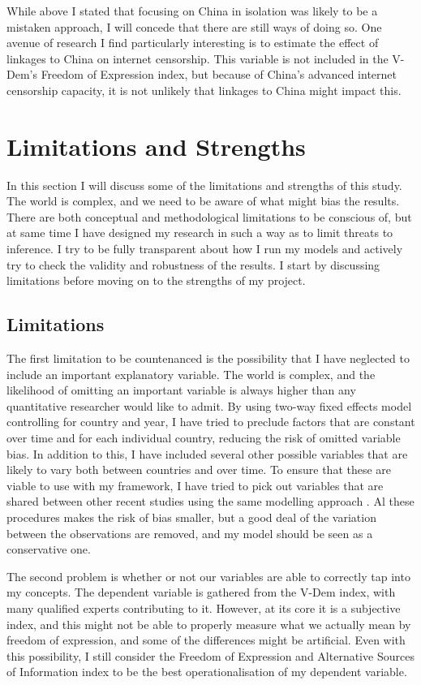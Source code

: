 While above I stated that focusing on China in isolation was likely to be a mistaken approach, I will concede that there are still ways of doing so. One avenue of research I find particularly interesting is to estimate the effect of linkages to China on internet censorship. This variable is not included in the V-Dem's Freedom of Expression index, but because of China's advanced internet censorship capacity, it is not unlikely that linkages to China might impact this.

\section{Limitations and Strengths}
In this section I will discuss some of the limitations and strengths of this study. The world is complex, and we need to be aware of what might bias the results. There are both conceptual and methodological limitations to be conscious of, but at same time I have designed my research in such a way as to limit threats to inference. I try to be fully transparent about how I run my models and actively try to check the validity and robustness of the results. I start by discussing limitations before moving on to the strengths of my project.

\subsection{Limitations}
The first limitation to be countenanced is the possibility that I have neglected to include an important explanatory variable. The world is complex, and the likelihood of omitting an important variable is always higher than any quantitative researcher would like to admit. By using two-way fixed effects model controlling for country and year, I have tried to preclude factors that are constant over time and for each individual country, reducing the risk of omitted variable bias. In addition to this, I have included several other possible variables that are likely to vary both between countries and over time. To ensure that these are viable to use with my framework, I have tried to pick out variables that are shared between other recent studies using the same modelling approach \citep{gamso_is_2021, toettoe_foreign_2023}. Al these procedures makes the risk of bias smaller, but a good deal of the variation between the observations are removed, and my model should be seen as a conservative one. 

The second problem is whether or not our variables are able to correctly tap into my concepts. The dependent variable is gathered from the V-Dem index, with many qualified experts contributing to it. However, at its core it is a subjective index, and this might not be able to properly measure what we actually mean by freedom of expression, and some of the differences might be artificial. Even with this possibility, I still consider the Freedom of Expression and Alternative Sources of Information index to be the best operationalisation of my dependent variable.

